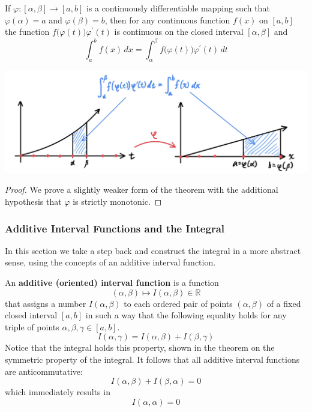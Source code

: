     \begin{theorem}
    If $\varphi: [\alpha, \beta] \longrightarrow [a, b]$ is a continuously differentiable mapping such that $\varphi(\alpha) = a$ and $\varphi(\beta) = b$, then for any continuous function $f(x)$ on $[a, b]$ the function $f\big(\varphi(t)\big) \varphi^\prime (t)$ is continuous on the closed interval $[\alpha, \beta]$ and 
    \[\int_a^b f(x)\,dx = \int_\alpha^\beta f\big(\varphi(t)\big) \varphi^\prime(t)\,dt\]
    \begin{center}
        \includegraphics[scale=0.25]{img/Change_of_Variable_Analysis_Integral.jpg}
    \end{center}
    \end{theorem}
    \begin{proof}
    We prove a slightly weaker form of the theorem with the additional hypothesis that $\varphi$ is strictly monotonic. 
    \end{proof}

    \subsubsection{Additive Interval Functions and the Integral}
    In this section we take a step back and construct the integral in a more abstract sense, using the concepts of an additive interval function. 

    \begin{definition}
      An \textbf{additive (oriented) interval function} is a function 
      \[(\alpha, \beta) \mapsto I(\alpha, \beta) \in \mathbb{R}\]
      that assigns a number $I(\alpha, \beta)$ to each ordered pair of points $(\alpha, \beta)$ of a fixed closed interval $[a, b]$ in such a way that the following equality holds for any triple of points $\alpha, \beta, \gamma \in [a, b]$. 
      \[I(\alpha, \gamma) = I(\alpha, \beta) + I(\beta, \gamma)\]
      Notice that the integral holds this property, shown in the theorem on the symmetric property of the integral. It follows that all additive interval functions are anticommutative: 
      \[I(\alpha, \beta) + I(\beta, \alpha) = 0\]
      which immediately results in
      \[I(\alpha, \alpha) = 0\]
    \end{definition}

